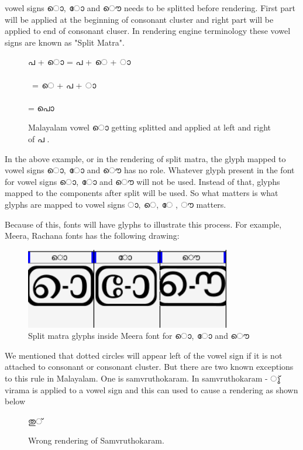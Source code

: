 vowel signs {\malayalam ൊ, ോ and ൌ} needs to be splitted before rendering. 
First part will be applied at the beginning of consonant cluster
and right part will be applied to end of consonant cluser. In rendering engine 
terminology these vowel signs are known as "Split Matra".

\begin{figure}[h]
  {\meera\textexample ‌പ +  ൊ = പ + െ + ാ \\\\\
  = െ + പ + ാ \\\\
  = പൊ }
  \caption{Malayalam vowel  {\malayalam ൊ} getting splitted and applied at left 
and right of {\malayalam പ} .}
\end{figure}

In the above example, or in the rendering of split matra, the glyph mapped to 
vowel signs {\malayalam ൊ, ോ and ൌ} has no role.
Whatever glyph present in the font for vowel signs {\malayalam ൊ, ോ and ൌ} will 
not be used. Instead of that, glyphs mapped to the components after split will 
be used. So what matters is what glyphs are mapped to vowel signs {\malayalam 
‌ാ, െ, േ , ൗ  } matters.

Because of this, fonts will have glyphs to illustrate this process. For 
example, Meera, Rachana fonts has the following drawing:

\begin{figure}[h]
  \includegraphics[width=0.8\textwidth]{malayalam-splitmatra-glyphs-meera.png}
  \caption{Split matra glyphs inside Meera font for  {\malayalam ൊ, ോ and ൌ}}
\end{figure}

We mentioned that dotted circles will appear left of the vowel sign if it is 
not attached to consonant or consonant cluster.
But there are two known exceptions to this rule in Malayalam. One is 
samvruthokaram. 
In samvruthokaram - {\malayalam ു്} virama is applied to a vowel sign and this 
can used to cause a rendering as shown below

\begin{figure}[h]
  \centering
  {\meera\textexample തു‌്}\\
  \caption{Wrong rendering of Samvruthokaram.}
\end{figure}

